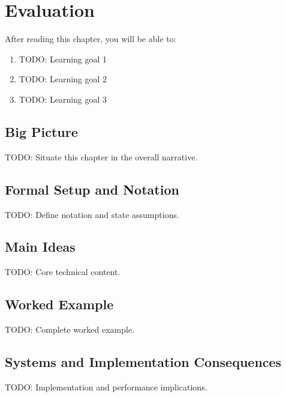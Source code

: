 \chapter{Evaluation}
\label{ch:21}

\begin{keyinsight}
After reading this chapter, you will be able to:
\begin{enumerate}
  \item TODO: Learning goal 1
  \item TODO: Learning goal 2
  \item TODO: Learning goal 3
\end{enumerate}
\end{keyinsight}

\section{Big Picture}
\label{ch:21:sec:big_picture}

TODO: Situate this chapter in the overall narrative.

\section{Formal Setup and Notation}
\label{ch:21:sec:setup}

TODO: Define notation and state assumptions.

\section{Main Ideas}
\label{ch:21:sec:main}

TODO: Core technical content.

\section{Worked Example}
\label{ch:21:sec:example}

TODO: Complete worked example.

\section{Systems and Implementation Consequences}
\label{ch:21:sec:systems}

TODO: Implementation and performance implications.

